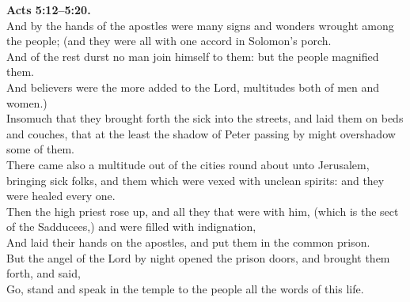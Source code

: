 \documentclass[10pt]{article} %
\begin{document}
{\begin{minipage}[t]{0.45\textwidth}
\textbf{Acts 5:12--5:20.}\\
And by the hands of the apostles were many signs and wonders wrought among the people; (and they were all with one accord in Solomon's porch.\\
And of the rest durst no man join himself to them: but the people magnified them.\\
And believers were the more added to the Lord, multitudes both of men and women.)\\
Insomuch that they brought forth the sick into the streets, and laid them on beds and couches, that at the least the shadow of Peter passing by might overshadow some of them.\\
There came also a multitude out of the cities round about unto Jerusalem, bringing sick folks, and them which were vexed with unclean spirits: and they were healed every one.\\
Then the high priest rose up, and all they that were with him, (which is the sect of the Sadducees,) and were filled with indignation,\\
And laid their hands on the apostles, and put them in the common prison.\\
But the angel of the Lord by night opened the prison doors, and brought them forth, and said,\\
Go, stand and speak in the temple to the people all the words of this life.\\

\end{minipage}}
\vspace*{\fill}
\newpage
\Huge%
\vspace*{\fill}
\begin{spacing}{1.3}%
\end{spacing}
\vspace*{\fill}
\end{document}
